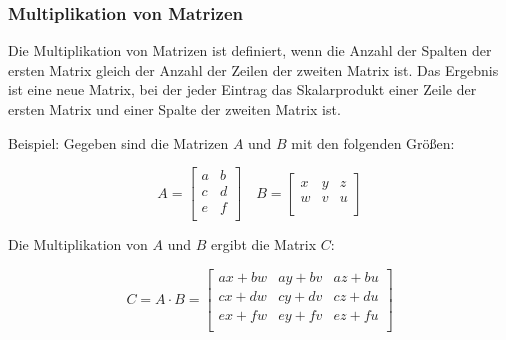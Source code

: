 \documentclass{beamer}
\begin{document}
\begin{frame}
  \frametitle{Multiplikation von Matrizen}
  
  Die Multiplikation von Matrizen ist definiert, wenn die Anzahl der Spalten der ersten Matrix gleich der Anzahl der Zeilen der zweiten Matrix ist. Das Ergebnis ist eine neue Matrix, bei der jeder Eintrag das Skalarprodukt einer Zeile der ersten Matrix und einer Spalte der zweiten Matrix ist.
  
  \vspace{0.2cm}
  
  Beispiel: Gegeben sind die Matrizen $A$ und $B$ mit den folgenden Größen:
  
  \[
  A = \begin{bmatrix}
    a & b \\
    c & d \\
    e & f \\
  \end{bmatrix}
  \quad
  B = \begin{bmatrix}
    x & y & z \\
    w & v & u \\
  \end{bmatrix}
  \]
  
  Die Multiplikation von $A$ und $B$ ergibt die Matrix $C$:
  
  \[
  C = A \cdot B = \begin{bmatrix}
    ax + bw & ay + bv & az + bu \\
    cx + dw & cy + dv & cz + du \\
    ex + fw & ey + fv & ez + fu \\
  \end{bmatrix}
  \]
\end{frame}
\end{document}
